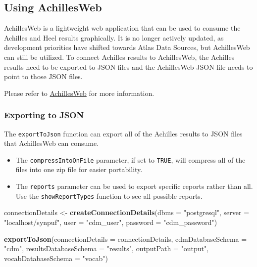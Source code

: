 \documentclass[]{article}
\newenvironment{Shaded}{\begin{snugshade}}{\end{snugshade}}
\newcommand{\KeywordTok}[1]{\textcolor[rgb]{0.13,0.29,0.53}{\textbf{#1}}}
\newcommand{\DataTypeTok}[1]{\textcolor[rgb]{0.13,0.29,0.53}{#1}}
\newcommand{\StringTok}[1]{\textcolor[rgb]{0.31,0.60,0.02}{#1}}
\newcommand{\NormalTok}[1]{#1}
\providecommand{\tightlist}{%
  \setlength{\itemsep}{0pt}\setlength{\parskip}{0pt}}
\begin{document}
\subsection{Using AchillesWeb}\label{using-achillesweb}

AchillesWeb is a lightweight web application that can be used to consume
the Achilles and Heel results graphically. It is no longer actively
updated, as development priorities have shifted towards Atlas Data
Sources, but AchillesWeb can still be utilized. To connect Achilles
results to AchillesWeb, the Achilles results need to be exported to JSON
files and the AchillesWeb JSON file needs to point to those JSON files.

Please refer to \href{https://github.com/OHDSI/AchillesWeb}{AchillesWeb}
for more information.

\subsubsection{Exporting to JSON}\label{exporting-to-json}

The \texttt{exportToJson} function can export all of the Achilles
results to JSON files that AchillesWeb can consume.

\begin{itemize}
\tightlist
\item
  The \texttt{compressIntoOnFile} parameter, if set to \texttt{TRUE},
  will compress all of the files into one zip file for easier
  portability.
\item
  The \texttt{reports} parameter can be used to export specific reports
  rather than all. Use the \texttt{showReportTypes} function to see all
  possible reports.
\end{itemize}

\begin{Shaded}
\begin{Highlighting}[]
\NormalTok{connectionDetails <-}\StringTok{ }\KeywordTok{createConnectionDetails}\NormalTok{(}\DataTypeTok{dbms =} \StringTok{"postgresql"}\NormalTok{, }
                                             \DataTypeTok{server =} \StringTok{"localhost/synpuf"}\NormalTok{, }
                                             \DataTypeTok{user =} \StringTok{"cdm_user"}\NormalTok{, }
                                             \DataTypeTok{password =} \StringTok{"cdm_password"}\NormalTok{)}

\KeywordTok{exportToJson}\NormalTok{(}\DataTypeTok{connectionDetails =}\NormalTok{ connectionDetails, }
             \DataTypeTok{cdmDatabaseSchema =} \StringTok{"cdm"}\NormalTok{, }
             \DataTypeTok{resultsDatabaseSchema =} \StringTok{"results"}\NormalTok{, }
             \DataTypeTok{outputPath =} \StringTok{"output"}\NormalTok{, }
             \DataTypeTok{vocabDatabaseSchema =} \StringTok{"vocab"}\NormalTok{)}
\end{Highlighting}
\end{Shaded}
\end{document}
